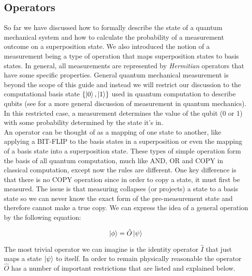 \subsection{Operators}

So far we have discussed how to formally describe the state of a quantum mechanical system and how to calculate the probability of a measurement outcome on a superposition state. We also introduced the notion of a measurement being a type of operation that maps superposition states to basis states. In general, all measurements are represented by \textit{Hermitian} operators that have some specific properties. General quantum mechanical measurement is beyond the scope of this guide and instead we will restrict our discussion to the computational basis state $\{\left\vert{0}\right\rangle, \left\vert{1}\right\rangle\}$ used in quantum computation to describe qubits (see \cite{Busch1996} for a more general discussion of measurement in quantum mechanics). In this restricted case, a measurement determines the value of the qubit (0 or 1) with some probability determined by the state it's in. \\

An operator can be thought of as a mapping of one state to another, like applying a BIT-FLIP to the basis states in a superposition or even the mapping of a basis state into a superposition state. These types of simple operation form the basis of all quantum computation, much like AND, OR and COPY in classical computation, except now the rules are different. One key difference is that there is no COPY operation since in order to copy a state, it must first be measured. The issue is that measuring collapses (or projects) a state to a basis state so we can never know the exact form of the pre-measurement state and therefore cannot make a true copy. We can express the idea of a general operation by the following equation:

\begin{equation}
    \left\vert{\phi}\right\rangle=\hat{O}\left\vert{\psi}\right\rangle
\end{equation}

The most trivial operator we can imagine is the identity operator $\hat{I}$ that just maps a state $\left\vert{\psi}\right\rangle$ to itself. In order to remain physically reasonable the operator $\hat{O}$ has a number of important restrictions that are listed and explained below.

